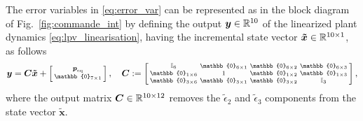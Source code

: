 The error variables in \eqref{eq:error_var} can be represented as in the block diagram of Fig.~\ref{fig:commande_int} by defining 
the output $\boldsymbol{y}\in {\mathbb R}^{10}$ of the linearized plant dynamics \eqref{eq:lpv_linearisation}, having the incremental state vector $\boldsymbol{\tilde{x}} \in {\mathbb R}^{10 \times 1}$, as follows
\begin{align}
    \label{eq:output_lin}
    \boldsymbol{y} = \boldsymbol{C} \boldsymbol{\tilde{x}} + \smallmat{\boldsymbol{p}_{\mathrm{eq}} \\ \mathbb{0}_{7 \times 1}}, \quad
 \boldsymbol{C} := \smallmat{\mathbb{I}_{6} & \mathbb{0}_{6\times 1} & \mathbb{0}_{6\times 2} &\mathbb{0}_{6\times 3}\\
    \mathbb{0}_{1\times 6} & 1 & \mathbb{0}_{1\times 2} &\mathbb{0}_{1\times 3}\\
    \mathbb{0}_{3\times 6} & \mathbb{0}_{3\times 1} & \mathbb{0}_{3\times 2} &  \mathbb{I}_{3}
},
\end{align}
where  the output matrix $\boldsymbol{C} \in {\mathbb R}^{10\times12}$ removes the $\tilde{\epsilon}_{2}$ and $\tilde{\epsilon}_{3}$ components from the state vector $\tilde{\boldsymbol{x}}$. 



